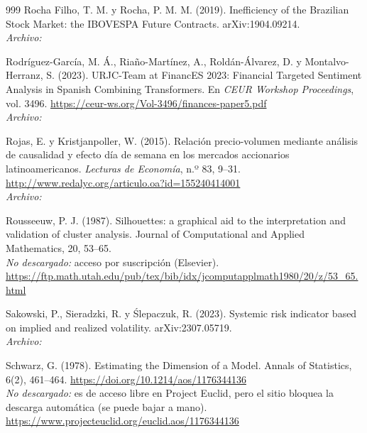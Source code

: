 \begin{thebibliography}{999}
Rocha Filho, T. M. y Rocha, P. M. M. (2019). Inefficiency of the Brazilian Stock Market: the IBOVESPA Future Contracts. arXiv:1904.09214.
\\\textit{Archivo:} 

Rodr{\'i}guez-Garc{\'i}a, M. \'A., Ria{\~n}o-Mart{\'i}nez, A., Rold{\'a}n-{\'A}lvarez, D. y Montalvo-Herranz, S. (2023). {URJC-Team} at {FinancES} 2023: Financial Targeted Sentiment Analysis in Spanish Combining Transformers. En \emph{CEUR Workshop Proceedings}, vol. 3496. \url{https://ceur-ws.org/Vol-3496/finances-paper5.pdf}
\\\textit{Archivo:} 

Rojas, E. y Kristjanpoller, W. (2015). Relaci{\'o}n precio-volumen mediante an{\'a}lisis de causalidad y efecto d{\'i}a de semana en los mercados accionarios latinoamericanos. \emph{Lecturas de Econom{\'i}a}, n.º 83, 9--31. \url{http://www.redalyc.org/articulo.oa?id=155240414001}
\\\textit{Archivo:} 

Rousseeuw, P. J. (1987). Silhouettes: a graphical aid to the interpretation and validation of cluster analysis. Journal of Computational and Applied Mathematics, 20, 53–65.
\\\textit{No descargado:} acceso por suscripción (Elsevier). \url{https://ftp.math.utah.edu/pub/tex/bib/idx/jcomputapplmath1980/20/z/53_65.html}

Sakowski, P., Sieradzki, R. y Ślepaczuk, R. (2023). Systemic risk indicator based on implied and realized volatility. arXiv:2307.05719.
\\\textit{Archivo:} 

Schwarz, G. (1978). Estimating the Dimension of a Model. Annals of Statistics, 6(2), 461–464. \url{https://doi.org/10.1214/aos/1176344136}
\\\textit{No descargado:} es de acceso libre en Project Euclid, pero el sitio bloquea la descarga automática (se puede bajar a mano). \url{https://www.projecteuclid.org/euclid.aos/1176344136}


\end{thebibliography}
